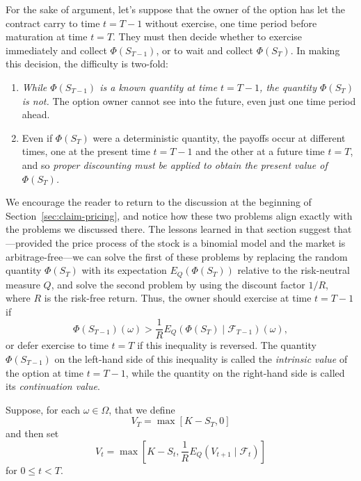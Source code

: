 \documentclass[11pt, openany, oneside]{book}
\theoremstyle{definition}
\theoremstyle{remark}
\theoremstyle{boldital}
\numberwithin{equation}{section}
\begin{document}
For the sake of argument, let's suppose that the owner of the option has let the contract carry to time $t=T-1$ without exercise, one time period before maturation at time $t=T$. They must then decide whether to exercise immediately and collect $\Phi(S_{T-1})$, or to wait and collect $\Phi(S_T)$. In making this decision, the difficulty is two-fold:
\begin{enumerate}
\item \textit{While $\Phi(S_{T-1})$ is a known quantity at time $t=T-1$, the quantity $\Phi(S_T)$ is not.} The option owner cannot see into the future, even just one time period ahead.
\item Even if $\Phi(S_T)$ were a deterministic quantity, the payoffs occur at different times, one at the present time $t=T-1$ and the other at a future time $t=T$, and so \textit{proper discounting must be applied to obtain the present value of $\Phi(S_T)$.}
\end{enumerate}
We encourage the reader to return to the discussion at the beginning of Section~\ref{sec:claim-pricing}, and notice how these two problems align exactly with the problems we discussed there. The lessons learned in that section suggest that---provided the price process of the stock is a binomial model and the market is arbitrage-free---we can solve the first of these problems by replacing the random quantity $\Phi(S_T)$ with its expectation $E_Q(\Phi(S_T))$ relative to the risk-neutral measure $Q$, and solve the second problem by using the discount factor $1/R$, where $R$ is the risk-free return. Thus, the owner should exercise at time $t=T-1$ if
	\begin{equation}\label{eq:american-intrinsic-continuation}
	\Phi(S_{T-1})(\omega) > \frac{1}{R} E_Q\left(\Phi(S_T)\mid \mathcal{F}_{T-1}\right)(\omega),
	\end{equation}
or defer exercise to time $t=T$ if this inequality is reversed. The quantity $\Phi(S_{T-1})$ on the left-hand side of this inequality is called the \textit{intrinsic value} of the option at time $t=T-1$, while the quantity on the right-hand side is called its \textit{continuation value}.

Suppose, for each $\omega\in \Omega$, that we define
	\[
	V_T = \max{ \left[ K-S_T, 0 \right]}
	\]
and then set
	\[
	V_t = \max{ \left[ K-S_t, \frac{1}{R} E_Q\left( V_{t+1} \mid \mathcal{F}_t \right)\right]}
	\]
for $0 \leq t < T$.
\end{document}
